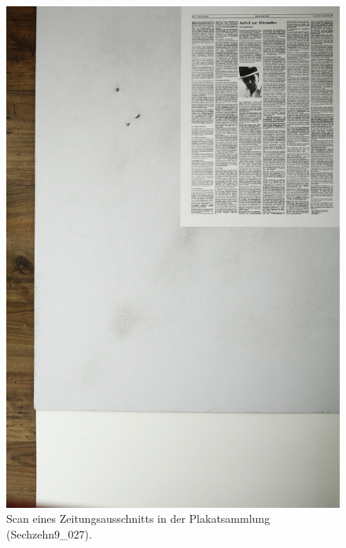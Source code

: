 \documentclass[a4paper,12pt,ngerman]{article}
\begin{document}
\newpage
\begin{figure}[ht]
\includegraphics[width=\linewidth]{Abbildung_14_(Sechzehn9_027)}
\centering
\caption{Scan eines Zeitungsausschnitts in der Plakatsammlung (Sechzehn9\_027).}
\end{figure}
\end{document}
